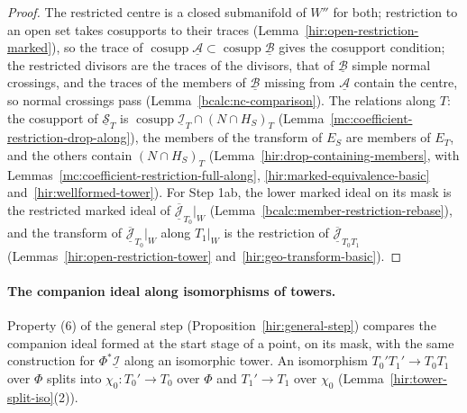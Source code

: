 \begin{proof}
\leanok
The restricted centre is a closed submanifold of \(W''\) for both; restriction to an open set takes cosupports to their traces
(Lemma~\ref{hir:open-restriction-marked}), so the trace of \(\operatorname{cosupp}\underline{\mathcal A}\subset\operatorname{cosupp}\underline{\mathcal B}\) gives the cosupport condition; the
restricted divisors are the traces of the divisors, that of \(\underline{\mathcal B}\) simple normal crossings, and the traces of the members of \(\underline{\mathcal B}\)
missing from \(\underline{\mathcal A}\) contain the centre, so normal crossings pass (Lemma~\ref{bcalc:nc-comparison}). The relations along \(T\): the cosupport of
\(\underline{\mathcal S}_T\) is \(\operatorname{cosupp}\underline{\mathcal I}_T\cap(N\cap H_S)_T\) (Lemma~\ref{mc:coefficient-restriction-drop-along}), the members of the transform of
\(E_S\) are members of \(E_T\), and the others contain \((N\cap H_S)_T\) (Lemma~\ref{hir:drop-containing-members}, with Lemmas~\ref{mc:coefficient-restriction-full-along},
\ref{hir:marked-equivalence-basic} and~\ref{hir:wellformed-tower}). For Step 1ab, the lower marked ideal on its mask is the restricted marked ideal of
\(\overline{\underline{\mathcal J}}_{T_0}|_W\) (Lemma~\ref{bcalc:member-restriction-rebase}), and the transform of \(\overline{\underline{\mathcal J}}_{T_0}|_W\) along \(T_1|_W\) is
the restriction of \(\overline{\underline{\mathcal J}}_{T_0T_1}\) (Lemmas~\ref{hir:open-restriction-tower} and~\ref{hir:geo-transform-basic}).
\end{proof}

\paragraph{The companion ideal along isomorphisms of towers.} Property (6) of the general step (Proposition~\ref{hir:general-step}) compares the
companion ideal formed at the start stage of a point, on its mask, with the same construction for \(\Phi^*\underline{\mathcal I}\) along an isomorphic
tower. An isomorphism \(T_0'T_1'\to T_0T_1\) over \(\Phi\) splits into \(\chi_0\colon T_0'\to T_0\) over \(\Phi\) and \(T_1'\to T_1\) over \(\chi_0\)
(Lemma~\ref{hir:tower-split-iso}(2)).

